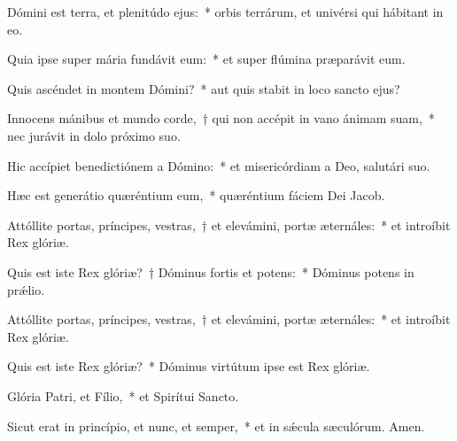 \item Dómini est terra, et plenitúdo ejus:~* orbis terrárum, et univérsi qui hábitant in eo.

\item Quia ipse super mária fundávit eum:~* et super flúmina præparávit eum.

\item Quis ascéndet in montem Dómini?~* aut quis stabit in loco sancto ejus?

\item Innocens mánibus et mundo corde,~† qui non accépit in vano ánimam suam,~* nec jurávit in dolo próximo suo.

\item Hic accípiet benedictiónem a Dómino:~* et misericórdiam a Deo, salutári suo.

\item Hæc est generátio quæréntium eum,~* quæréntium fáciem Dei Jacob.

\item Attóllite portas, príncipes, vestras,~† et elevámini, portæ æternáles:~* et introíbit Rex glóriæ.

\item Quis est iste Rex glóriæ?~† Dóminus fortis et potens:~* Dóminus potens in prǽlio.

\item Attóllite portas, príncipes, vestras,~† et elevámini, portæ æternáles:~* et introíbit Rex glóriæ.

\item Quis est iste Rex glóriæ?~* Dóminus virtútum ipse est Rex glóriæ.

\item Glória Patri, et Fílio,~* et Spirítui Sancto.

\item Sicut erat in princípio, et nunc, et semper,~* et in sǽcula sæculórum. Amen.

